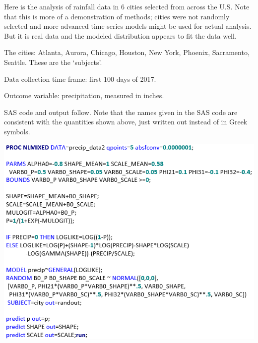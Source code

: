 \documentclass[
  9pt,
  ignorenonframetext,
]{beamer}
\begin{document}
\begin{frame}{}
\protect\hypertarget{section-6}{}
Here is the analysis of rainfall data in 6 cities selected from across
the U.S. Note that this is more of a demonstration of methods; cities
were not randomly selected and more advanced time-series models might be
used for actual analysis. But it is real data and the modeled
distribution appears to fit the data well.

The cities: Atlanta, Aurora, Chicago, Houston, New York, Phoenix,
Sacramento, Seattle. These are the `subjects'.

Data collection time frame: first 100 days of 2017.

Outcome variable: precipitation, measured in inches.
\end{frame}

\begin{frame}{}
\protect\hypertarget{section-7}{}
SAS code and output follow. Note that the names given in the SAS code
are consistent with the quantities shown above, just written out instead
of in Greek symbols.

\begin{center}\includegraphics[width=1\linewidth]{figs_L18/f1} \end{center}
\end{frame}
\end{document}
